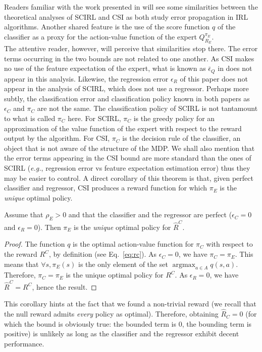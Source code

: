\documentclass{llncs}
\newcommand{\argmax}{\operatorname*{argmax}} %
\begin{document}
Readers familiar with the work presented in \cite{klein2012scirl} will see some similarities between the theoretical analyses of SCIRL and CSI as both study error propagation in IRL algorithms. Another shared feature is the use of the score function $q$ of the classifier as a proxy for the action-value function of the expert $Q^{\pi_E}_{R_E}$. \\
The attentive reader, however, will perceive that similarities stop there. The error terms occurring in the two bounds are not related to one another. As CSI makes no use of the feature expectation of the expert, what is known as $\bar\epsilon_Q$ in \cite{klein2012scirl} does not appear in this analysis. Likewise, the regression error $\epsilon_R$ of this paper does not appear in the analysis of SCIRL, which does not use a regressor. Perhaps more subtly, the classification error and classification policy known in both papers as $\epsilon_C$ and $\pi_C$ are not the same. The classification policy of SCIRL is not tantamount to what is called $\pi_C$ here. For SCIRL, $\pi_C$ is the greedy policy for an approximation of the value function of the expert with respect to the reward output by the algorithm. For CSI, $\pi_C$ is the decision rule of the classifier, an object that is not aware of the structure of the MDP. We shall also mention that the error terms appearing in the CSI bound are more standard than the ones of SCIRL ({\it e.g.}, regression error vs feature expectation estimation error) thus they may be easier to control.
A direct corollary of this theorem is that, given perfect classifier and regressor, CSI produces a reward function for which $\pi_E$ is the \emph{unique} optimal policy.
\begin{corollary}
  \label{cor}
  Assume that $\rho_E>0$ and that the classifier and the regressor are perfect ($\epsilon_C = 0$ and $\epsilon_R = 0$). Then $\pi_E$ is the \emph{unique} optimal policy for $\hat R^C$.
\end{corollary}
\begin{proof}

  The function $q$ is the optimal action-value function for $\pi_C$ with respect to the reward $R^C$, by definition (see Eq.~\eqref{eq:rc}).
  As $\epsilon_C = 0$, we have $\pi_C = \pi_E$. This means that $\forall s, \pi_E(s)$ is the only element of the set $\argmax_{a\in A}q(s,a)$. Therefore, $\pi_C = \pi_E$ is the unique optimal policy for $R^C$.
  As $\epsilon_R = 0$, we have $\hat R^C = R^C$, hence the result.
\end{proof}
This corollary hints at the fact that we found a non-trivial reward (we recall that the null reward admits \emph{every} policy as optimal). Therefore, obtaining  $\hat{R}_C = 0$ (for which the bound is obviously true: the bounded term is $0$, the bounding term is positive) is unlikely as long as the classifier and the regressor exhibit decent performance.
\end{document}

